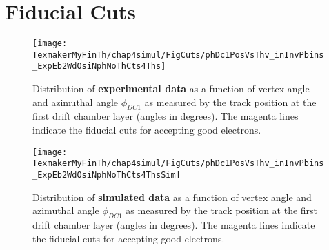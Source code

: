 \section{Fiducial Cuts}
\label{fidCuts}


\begin{figure}[h] %
\centering
\leavevmode \texttt{[image: TexmakerMyFinTh/chap4simul/FigCuts/phDc1PosVsThv\_inInvPbins\_ExpEb2WdOsiNphNoThCts4Ths]} 
\caption[Fiducial cuts (Experimental Data)]{Distribution of {\bf experimental data} as a function of vertex angle \th and azimuthal angle $\phi_{DC1}$ as measured by the track position at the first drift chamber layer (angles in degrees). The magenta lines indicate the fiducial cuts for accepting good electrons. %
} %
\label{figfidCts}
\end{figure}

\begin{figure}[h] %
\centering
\leavevmode \texttt{[image: TexmakerMyFinTh/chap4simul/FigCuts/phDc1PosVsThv\_inInvPbins\_ExpEb2WdOsiNphNoThCts4ThsSim]} 
\caption[Fiducial cuts (Simulated Data)]{Distribution of {\bf simulated data} as a function of vertex angle \th and azimuthal angle $\phi_{DC1}$ as measured by the track position at the first drift chamber layer (angles in degrees). The magenta lines indicate the fiducial cuts for accepting good electrons. 
} %
\label{figfidCts}
\end{figure}




